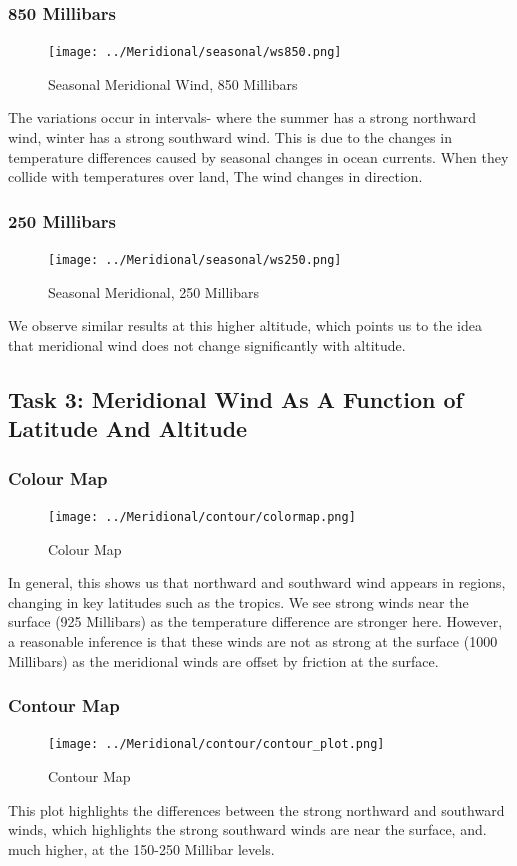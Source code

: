 \documentclass[hidelinks]{article}
\begin{document}
\subsubsection{850 Millibars}
\begin{figure}[h!]
	\centering
	\texttt{[image: ../Meridional/seasonal/ws850.png]}
	\caption{Seasonal Meridional Wind, 850 Millibars}
\end{figure}
\noindent The variations occur in intervals- where the summer has a strong northward wind, winter has a strong southward wind. This is due to the changes in temperature differences caused by seasonal changes in ocean currents. When they collide with temperatures over land, The wind changes in direction. 
\subsubsection{250 Millibars}
\begin{figure}[h!]
	\centering
	\texttt{[image: ../Meridional/seasonal/ws250.png]}
	\caption{Seasonal Meridional, 250 Millibars}
\end{figure}
\noindent We observe similar results at this higher altitude, which points us to the idea that meridional wind does not change significantly with altitude.
\newpage
\subsection{Task 3: Meridional Wind As A Function of Latitude And Altitude}
\subsubsection{Colour Map}
\begin{figure}[h!]
	\centering
	\texttt{[image: ../Meridional/contour/colormap.png]}
	\caption{Colour Map}
\end{figure}
\noindent In general, this shows us that northward and southward wind appears in regions, changing in key latitudes such as the tropics. We see strong winds near the surface (925 Millibars) as the temperature difference are stronger here. However, a reasonable inference is that these winds are not as strong at the surface (1000 Millibars) as the meridional winds are offset by friction at the surface.
\subsubsection{Contour Map}
\begin{figure}[h!]
	\centering
	\texttt{[image: ../Meridional/contour/contour\_plot.png]}
	\caption{Contour Map}
\end{figure}
\noindent This plot highlights the differences between the strong northward and southward winds, which highlights the strong southward winds are near the surface, and. much higher, at the 150-250 Millibar levels.
\end{document}
